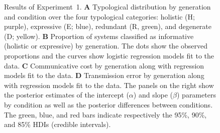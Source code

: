 \documentclass[doc,biblatex]{apa7}
\begin{document}
	\begin{figure}
	\vspace*{2pt}
	\caption{Results of Experiment~1. \textbf{A} Typological distribution by generation and condition over the four typological categories: holistic (H; purple), expressive (E; blue), redundant (R, green), and degenerate (D; yellow). \textbf{B} Proportion of systems classified as informative (holistic or expressive) by generation. The dots show the observed proportions and the curves show logistic regression models fit to the data. \textbf{C} Communicative cost by generation along with regression models fit to the data. \textbf{D} Transmission error by generation along with regression models fit to the data. The panels on the right show the posterior estimates of the intercept ($\alpha$) and slope ($\beta$) parameters by condition as well as the posterior differences between conditions. The green, blue, and red bars indicate respectively the 95\%, 90\%, and 85\% HDIs (credible intervals).}
	\label{results_exp1}
	\end{figure}
\end{document}

